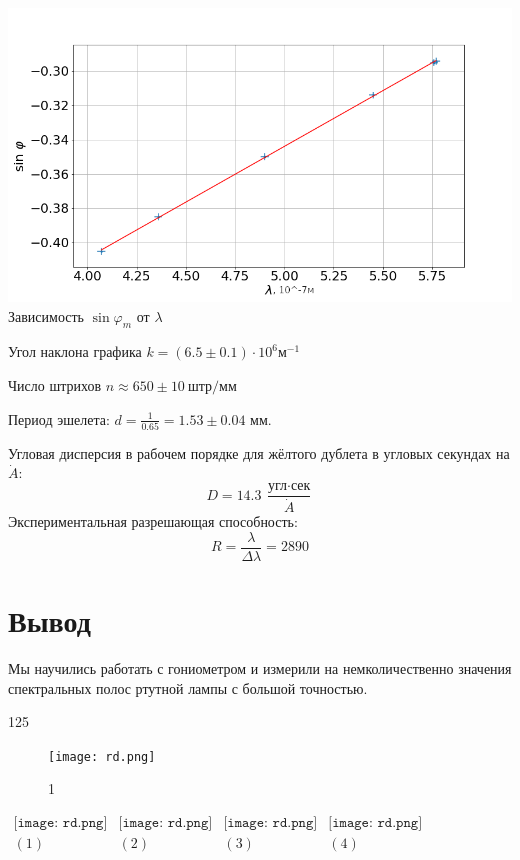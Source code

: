 \includegraphics[width = 1.0\linewidth]{g1.png}
{Зависимость $\sin \varphi_m$ от $\lambda$}

Угол наклона графика $k = (6.5 \pm 0.1)\cdot 10^6 \text{м}^{-1}$

Число штрихов $n \approx 650 \pm 10\ \text{штр}/\text{мм}$

Период эшелета: $d = \frac{1}{0.65} = 1.53 \pm 0.04$ мм.

Угловая дисперсия в рабочем порядке для жёлтого дублета в угловых секундах на $\dot A$:
\[
D = 14.3\ \frac{\text{угл} \cdot \text{сек}}{\dot A}
\]
Экспериментальная разрешающая способность:
\[
R = \frac{\lambda}{\Delta \lambda} = 2890
\]

\section*{Вывод}
Мы научились работать с гониометром и измерили на немколичественно значения спектральных полос ртутной лампы с большой точностью.




125





\lipsum[1-4]
\begin{figure}
\centering
\texttt{[image: rd.png]}
\caption{1}
\end{figure}
\lipsum[1-6]


\begin{center}
\begin{center}$
\begin{array}{cccc}
\texttt{[image: rd.png]}&
\texttt{[image: rd.png]}&
\texttt{[image: rd.png]}&
\texttt{[image: rd.png]}\\
(1) & (2) & (3) & (4)
\end{array}$
\end{center}
\end{center}

